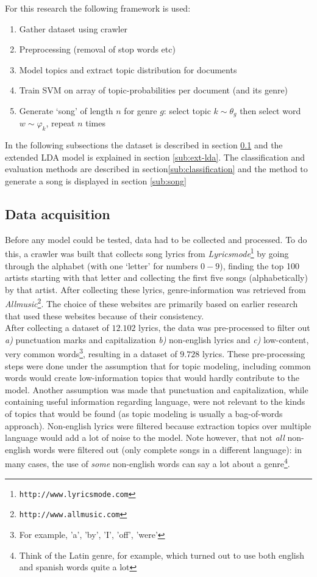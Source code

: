 For this research the following framework is used:
\begin{enumerate}
	\item Gather dataset using crawler
	\item Preprocessing (removal of stop words etc)
	\item Model topics and extract topic distribution for documents
	\item Train SVM on array of topic-probabilities per document (and its genre)
	\item Generate `song' of length $n$ for genre $g$: select topic $k \sim \theta_g$ then select word $w \sim \varphi_k$, repeat $n$ times
\end{enumerate}

In the following subsections the dataset is described in section \ref{sub:prep} and the extended LDA model is explained in section \ref{sub:ext-lda}. The classification and evaluation methods are described in section\ref{sub:classification} and the method to generate a song is displayed in section \ref{sub:song}

\subsection{Data acquisition}\label{sub:prep}
Before any model could be tested, data had to be collected and processed. To do this, a crawler was built that collects song lyrics from \textit{Lyricsmode}\footnote{\texttt{http://www.lyricsmode.com}} by going through the alphabet (with one `letter' for numbers $0-9$), finding the top 100 artists starting with that letter and collecting the first five songs (alphabetically) by that artist. After collecting these lyrics, genre-information was retrieved from \textit{Allmusic}\footnote{\texttt{http://www.allmusic.com}}. The choice of these websites are primarily based on earlier research \cite{felllyrics} that used these websites because of their consistency. \\
After collecting a dataset of $12.102$ lyrics, the data was pre-processed to filter out \textit{a)} punctuation marks and capitalization \textit{b)} non-english lyrics and \textit{c)} low-content, very common words\footnote{For example, 'a', 'by', 'I', 'off', 'were'}, resulting in a dataset of $9.728$ lyrics. These pre-processing steps were done under the assumption that for topic modeling, including common words would create low-information topics that would hardly contribute to the model. Another assumption was made that punctuation and capitalization, while containing useful information regarding language, were not relevant to the kinds of topics that would be found (as topic modeling is usually a bag-of-words approach). Non-english lyrics were filtered because extraction topics over multiple language would add a lot of noise to the model. Note however, that not \textit{all} non-english words were filtered out (only complete songs in a different language): in many cases, the use of \textit{some} non-english words can say a lot about a genre\footnote{Think of the Latin genre, for example, which turned out to use both english and spanish words quite a lot}. 

